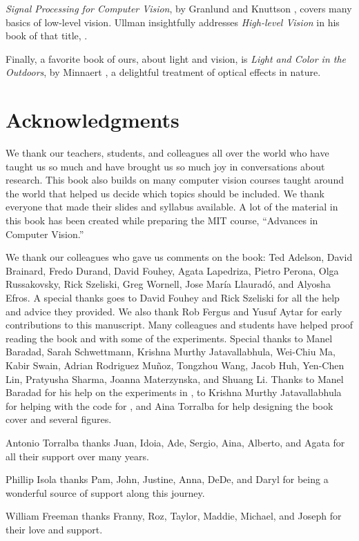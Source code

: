 \textit{Signal Processing for Computer Vision}, by Granlund and Knuttson \cite{Granlund95},
covers many basics of low-level vision.  Ullman insightfully addresses
\textit{High-level Vision} in his book of that title, \cite{Ullman2000}.

Finally, a favorite book of ours, about light and vision, is
\textit{Light and Color in the Outdoors}, by Minnaert \cite{Minnaert2012}, a delightful treatment
of optical effects in nature.

\section*{Acknowledgments}

We thank our teachers, students, and colleagues all over the world who have taught us so much and have brought us so much joy in conversations about research. This book also builds on many computer vision courses taught around the world that helped us decide which topics should be included. We thank everyone that made their slides and syllabus available. A lot of the material in this book has been created while preparing the MIT course, ``Advances in Computer Vision.''

We thank our colleagues who gave us comments on the book: Ted Adelson, David Brainard, Fredo Durand, David Fouhey, Agata Lapedriza, Pietro Perona, Olga Russakovsky, Rick Szeliski, Greg Wornell, Jose María Llauradó, and Alyosha Efros. A special thanks goes to David Fouhey and Rick Szeliski for all the help and advice they provided. We  also thank Rob Fergus and Yusuf Aytar for early contributions to this manuscript. Many colleagues and students have helped proof reading the book and with some of the experiments. Special thanks to Manel Baradad, Sarah Schwettmann, Krishna Murthy Jatavallabhula, Wei-Chiu Ma, Kabir Swain, Adrian Rodriguez Muñoz, Tongzhou Wang, Jacob Huh, Yen-Chen Lin, Pratyusha Sharma, Joanna Materzynska, and Shuang Li.
Thanks to Manel Baradad for his help on the experiments in \chap{\ref{chap:simple_system_revisited}},  to Krishna Murthy Jatavallabhula for helping with the code for \chap{\ref{chapter:3D_multiview}}, 
and Aina Torralba for help designing the book cover and several figures. 

Antonio Torralba thanks Juan, Idoia, Ade, Sergio, Aina, Alberto, and Agata for all their support over many years.


Phillip Isola thanks Pam, John, Justine, Anna, DeDe, and Daryl for being a wonderful source of support along this journey. 

William Freeman thanks Franny, Roz, Taylor, Maddie, Michael, and Joseph for their love and support.  

